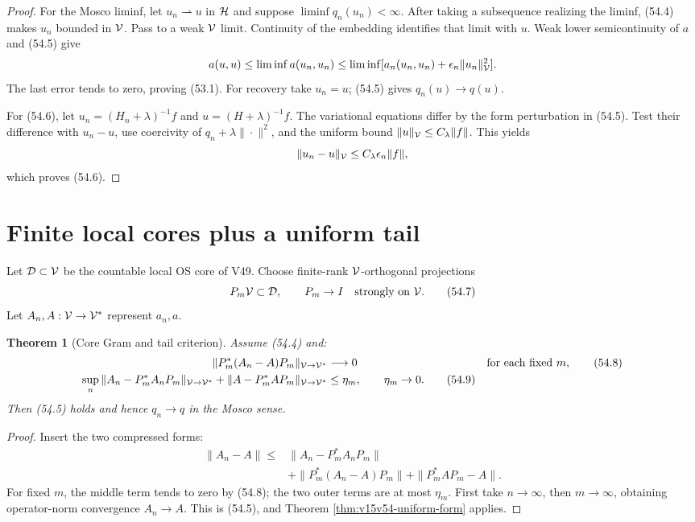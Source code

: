 \documentclass[11pt]{article}
\newtheorem{theorem}{Theorem}[section]
\theoremstyle{remark}
\begin{document}
\begin{proof}
For the Mosco liminf, let \(u_n\rightharpoonup u\) in
\({\cal H}\) and suppose \(\liminf q_n(u_n)<\infty\).
After taking a subsequence realizing the liminf, (54.4) makes
\(u_n\) bounded in \({\cal V}\).  Pass to a weak
\({\cal V}\) limit.  Continuity of the embedding identifies that
limit with \(u\).  Weak lower semicontinuity of \(a\) and (54.5)
give
\[
 a(u,u)\leq\liminf a(u_n,u_n)
 \leq\liminf[a_n(u_n,u_n)+
 \epsilon_n\|u_n\|_{\cal V}^2].
\]
The last error tends to zero, proving (53.1).  For recovery take
\(u_n=u\); (54.5) gives \(q_n(u)\to q(u)\).

For (54.6), let \(u_n=(H_n+\lambda)^{-1}f\) and
\(u=(H+\lambda)^{-1}f\).  The variational equations differ by the
form perturbation in (54.5).  Test their difference with
\(u_n-u\), use coercivity of \(q_n+\lambda\|\cdot\|^2\), and the
uniform bound \(\|u\|_{\cal V}\leq C_\lambda\|f\|\).  This yields
\[
 \|u_n-u\|_{\cal V}
 \leq C_\lambda\epsilon_n\|f\|,
\]
which proves (54.6).
\end{proof}

\section{Finite local cores plus a uniform tail}

Let \({\cal D}\subset{\cal V}\) be the countable local OS core of
V49.  Choose finite-rank \({\cal V}\)-orthogonal projections
\[
 P_m{\cal V}\subset{\cal D},\qquad P_m\to I
 \quad\text{strongly on }{\cal V}.                      \tag{54.7}
\]
Let \(A_n,A:{\cal V}\to{\cal V}^*\) represent \(a_n,a\).

\begin{theorem}[Core Gram and tail criterion]
\label{thm:v15v54-core-tail}
Assume (54.4) and:
\begin{align}
 \|P_m^*(A_n-A)P_m\|_{{\cal V}\to{\cal V}^*}
 &\longrightarrow0
 &&\text{for each fixed \(m\)},                         \tag{54.8}\\
 \sup_n\|A_n-P_m^*A_nP_m\|_{{\cal V}\to{\cal V}^*}
 +\|A-P_m^*AP_m\|_{{\cal V}\to{\cal V}^*}
 &\leq\eta_m,\qquad \eta_m\to0.                         \tag{54.9}
\end{align}
Then (54.5) holds and hence \(q_n\to q\) in the Mosco sense.
\end{theorem}

\begin{proof}
Insert the two compressed forms:
\[
 \begin{split}
 \|A_n-A\|
 \leq{}&\|A_n-P_m^*A_nP_m\|\\
 &+\|P_m^*(A_n-A)P_m\|
 +\|P_m^*AP_m-A\|.                                     \tag{54.10}
 \end{split}
\]
For fixed \(m\), the middle term tends to zero by (54.8); the two
outer terms are at most \(\eta_m\).  First take \(n\to\infty\), then
\(m\to\infty\), obtaining operator-norm convergence
\(A_n\to A\).  This is (54.5), and Theorem
\ref{thm:v15v54-uniform-form} applies.
\end{proof}
\end{document}
